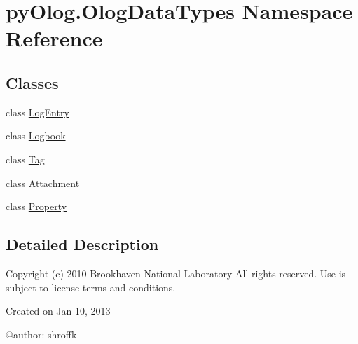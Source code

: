 \hypertarget{namespacepyOlog_1_1OlogDataTypes}{\section{py\-Olog.\-Olog\-Data\-Types Namespace Reference}
\label{namespacepyOlog_1_1OlogDataTypes}
}
\subsection*{Classes}
\begin{DoxyCompactItemize}
\item 
class \hyperlink{classpyOlog_1_1OlogDataTypes_1_1LogEntry}{Log\-Entry}
\item 
class \hyperlink{classpyOlog_1_1OlogDataTypes_1_1Logbook}{Logbook}
\item 
class \hyperlink{classpyOlog_1_1OlogDataTypes_1_1Tag}{Tag}
\item 
class \hyperlink{classpyOlog_1_1OlogDataTypes_1_1Attachment}{Attachment}
\item 
class \hyperlink{classpyOlog_1_1OlogDataTypes_1_1Property}{Property}
\end{DoxyCompactItemize}


\subsection{Detailed Description}
\begin{DoxyVerb}Copyright (c) 2010 Brookhaven National Laboratory
All rights reserved. Use is subject to license terms and conditions.

Created on Jan 10, 2013

@author: shroffk
\end{DoxyVerb}
 